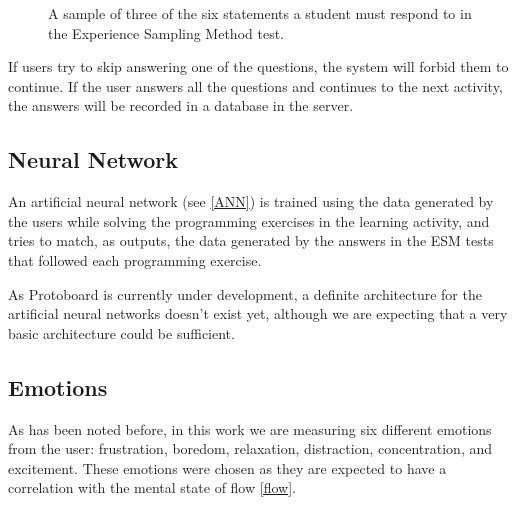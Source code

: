 \documentclass{acm_proc_article-sp}
\begin{document}
\begin{figure}
  \centering
  \caption{A sample of three of the six statements a student must
    respond to in the Experience Sampling Method test.}
  \label{fig:ESM-test}
\end{figure}

If users try to skip answering one of the questions, the system
will forbid them to continue. If the user answers all the questions
and continues to the next activity, the answers will be recorded in a
database in the server.


\subsection{Neural Network}

An artificial neural network (see \ref{ANN}) is trained using the data generated
by the users while solving the programming exercises in the learning
activity, and tries to match, as outputs, the data generated by the
answers in the ESM tests that followed each programming exercise.

As Protoboard is currently under development, a definite architecture
for the artificial neural networks doesn't exist yet, although we are
expecting that a very basic architecture could be sufficient.


\subsection{Emotions}

As has been noted before, in this work we are measuring six different
emotions from the user: frustration, boredom, relaxation, distraction,
concentration, and excitement. These emotions were chosen as they are
expected to have a correlation with the mental state of flow \ref{flow}.




\balancecolumns
\end{document}
